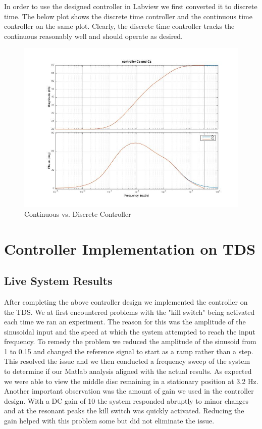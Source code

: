 \documentclass[11pt,titlepage]{article}
\begin{document}
        In order to use the designed controller in Labview we first converted it to discrete time. The below plot shows the discrete time controller and the continuous time controller on the same plot. Clearly, the discrete time controller tracks the continuous reasonably well and should operate as desired.
        \begin{figure}[H]
            \centering
            \includegraphics[scale=0.35]{Cs_Cz}
            \caption{Continuous vs. Discrete Controller}
            \label{fig:csCz}
        \end{figure}

\section{Controller Implementation on TDS}
    \subsection{Live System Results}
        After completing the above controller design we implemented the controller on the TDS. We at first encountered problems with the "kill switch" being activated each time we ran an experiment. The reason for this was the amplitude of the sinusoidal input and the speed at which the system attempted to reach the input frequency. To remedy the problem we reduced the amplitude of the sinusoid from 1 to 0.15 and changed the reference signal to start as a ramp rather than a step. This resolved the issue and we then conducted a frequency sweep of the system to determine if our Matlab analysis aligned with the actual results. As expected we were able to view the middle disc remaining in a stationary position at 3.2 Hz. Another important observation was the amount of gain we used in the controller design. With a DC gain of 10 the system responded abruptly to minor changes and at the resonant peaks the kill switch was quickly activated. Reducing the gain helped with this problem some but did not eliminate the issue.
\end{document}
